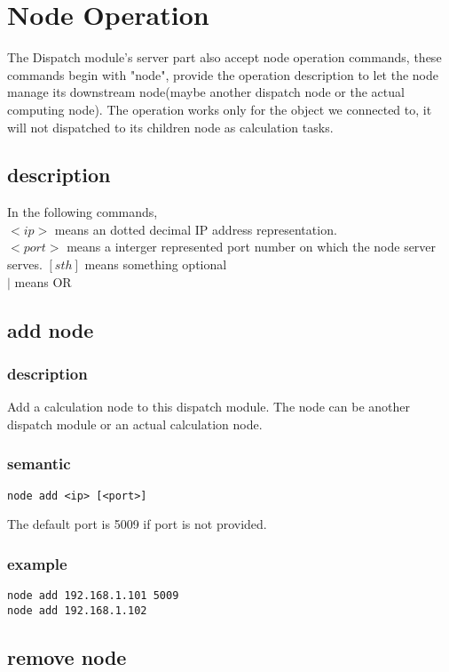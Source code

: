 \documentclass[10pt]{article}
\begin{document}
\section{Node Operation}
The Dispatch module's server part also accept node operation commands, these commands begin with "node", 
provide the operation description to let the node manage its downstream node(maybe another dispatch node
or the actual computing node). The operation works only for the object we connected to, it will not 
dispatched to its children node as calculation tasks.

\subsection{description}
In the following commands,\\
$<ip>$ means an dotted decimal IP address representation.\\
$<port>$ means a interger represented port number on which the node server serves.
$[sth]$ means something optional\\
$|$ means OR 

\subsection{add node}
\subsubsection{description}
Add a calculation node to this dispatch module. The node can be another dispatch module or an actual 
calculation node.

\subsubsection{semantic}
\begin{verbatim}
node add <ip> [<port>]
\end{verbatim}
The default port is 5009 if port is not provided.

\subsubsection{example}
\begin{verbatim}
node add 192.168.1.101 5009
node add 192.168.1.102
\end{verbatim}

\subsection{remove node}
\end{document}
